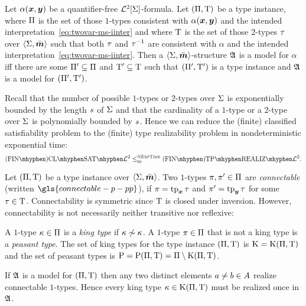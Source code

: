 \begin{remark}\label{rem:red-sat-to-real}
Let $\alpha(\bm{x},\bm{y})$ be a quantifier-free $\mathcal{L}^{2}[\mathrm{\Sigma}]$-formula.
Let $(\Pi,\mathrm{T})$ be a type instance, where $\Pi$ is the set of those
$1$-types consistent with $\alpha(\bm{x},\bm{y})$ and the intended
interpretation~\cref{eq:twovar-ms-iinter} and where $\mathrm{T}$ is the set of
those $2$-types $\tau$ over $\left\langle \mathrm{\Sigma},\bar{\bm{m}} \right\rangle$ such that both $\tau$ and 
$\tau^{-1}$ are consistent with $\alpha$ and the intended interpretation~\cref{eq:twovar-ms-iinter}. Then a $\left\langle \mathrm{\Sigma},\bar{\bm{m}} \right\rangle$-structure
$\mathfrak{A}$ is a model for $\alpha$ iff there are some ${\Pi'} \subseteq \Pi$ and
${\mathrm{T}'} \subseteq \mathrm{T}$ such that $({\Pi'},{\mathrm{T}'})$ is a type instance and
$\mathfrak{A}$ is a model for $({\Pi'},{\mathrm{T}'})$.

Recall that the number of possible $1$-types or $2$-types over $\mathrm{\Sigma}$ is
exponentially bounded by the length $s$ of $\mathrm{\Sigma}$ and that the cardinality
of a $1$-type or a $2$-type over $\mathrm{\Sigma}$ is polynomially bounded by $s$.
Hence we can reduce the (finite) classified satisfiability problem to the
(finite) type realizability problem in nondeterministic exponential time:
\[
  \FinAClSat{\vFo2} \red\cNExpTime \FinAReal{\vFo2}.
\]
\end{remark}

\begin{definition}\label{def:connectable}
Let $(\Pi,\mathrm{T})$ be a type instance over $\left\langle \mathrm{\Sigma},\bar{\bm{m}} \right\rangle$.
Two $1$-types $\pi, {\pi'} \in \Pi$ are \emph{connectable} 
(written $\gls{connectable-p-pp}$), 
if $\pi = \operatorname{tp}_{\bm{x}}\tau$ and ${\pi'} = \operatorname{tp}_{\bm{y}}\tau$ for some $\tau \in \mathrm{T}$.
Connectability is symmetric since $\mathrm{T}$ is closed under inversion.
However, connectability is not necessarily neither transitive nor reflexive:

A $1$-type $\kappa \in \Pi$ is a \emph{king type} if $\kappa \not\sim \kappa$.
A $1$-type $\pi \in \Pi$ that is not a king type is a \emph{peasant type}.
The set of king types for the type instance $(\Pi,\mathrm{T})$ is
$\mathrm{K} = \mathrm{K}(\Pi,\mathrm{T})$ and the set of peasant types is
$\mathrm{P} = \mathrm{P}(\Pi,\mathrm{T}) = \Pi \setminus \mathrm{K}(\Pi,\mathrm{T})$.
\end{definition}
\begin{remark}\label{rem:twovar-king-once}
If $\mathfrak{A}$ is a model for $(\Pi,\mathrm{T})$ then any two distinct
elements $a \neq b \in A$ realize connectable $1$-types. Hence every king type
$\kappa \in \mathrm{K}(\Pi,\mathrm{T})$ must be realized once in $\mathfrak{A}$.
\end{remark}

